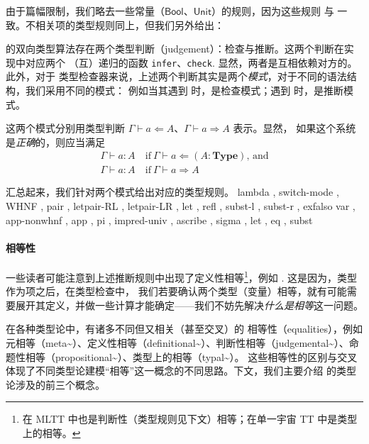 \documentclass[a4paper, 11pt]{article}
\theoremstyle{remark}\newtheorem*{remark}{Remark}
\theoremstyle{definition}\newtheorem*{definition}{Definition}
\begin{document}
由于篇幅限制，我们略去一些常量（$\mathsf{Bool}$、$\mathsf{Unit}$）的规则，因为这些规则
与 \Tigris 一致。不相关项的类型规则同上，但我们另外给出：


\Tigrisd 的双向类型算法存在两个类型判断（judgement）：检查与推断。这两个判断在实现中对应两个
（互）递归的函数 \texttt{infer}、\texttt{check}. 显然，两者是互相依赖对方的。此外，对于
类型检查器来说，上述两个判断其实是两个\emph{模式}，对于不同的语法结构，我们采用不同的模式：
例如当其遇到  时，是检查模式；遇到  时，是推断模式。

这两个模式分别用类型判断 $\Gamma\vdash a\Leftarrow A$、$\Gamma\vdash a\Rightarrow A$ 表示。显然，
如果这个系统是\emph{正确}的，则应当满足
\begin{align*}
\Gamma\vdash a : A&\ \text{if}\ \Gamma\vdash a\Leftarrow (A : \mathbf{Type})\text{, and}\\
\Gamma\vdash a : A&\ \text{if}\ \Gamma\vdash a\Rightarrow A
\end{align*}

汇总起来，我们针对两个模式给出对应的类型规则。
{ lambda
, switch-mode
, WHNF
, pair
, letpair-RL
, letpair-LR
, let
, refl
, subst-l
, subst-r
, exfalso}
{ var
, app-nonwhnf
, app
, pi
, impred-univ
, ascribe
, sigma
, let
, eq
, subst}

\paragraph{相等性}

一些读者可能注意到上述推断规则中出现了定义性相等\footnote{
在 MLTT 中也是判断性（类型规则见下文）相等；在单一宇宙 TT 中是类型上的相等。
}，例如 . 这是因为，类型作为项之后，在类型检查中，
我们若要确认两个类型（变量）相等，就有可能需要展开其定义，并做一些计算才能确定——我们不妨先解决\emph{什么是相等}这一问题。

在各种类型论中，有诸多不同但又相关（甚至交叉）的
相等性（equalities），例如元相等（meta\textasciitilde）、定义性相等（definitional\textasciitilde）、判断性相等（judgemental\textasciitilde）、命题性相等（propositional\textasciitilde）、类型上的相等（typal\textasciitilde）。
这些相等性的区别与交叉体现了不同类型论建模“相等”这一概念的不同思路。下文，我们主要介绍 \Tigrisd 的类型论涉及的前三个概念。
\end{document}
